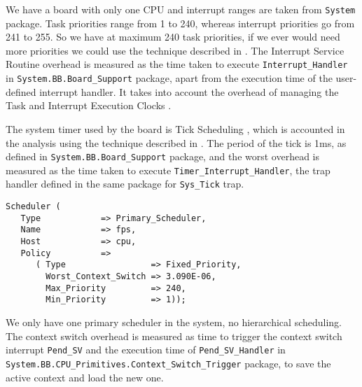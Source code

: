 \documentclass{article}
\begin{document}
We have a board with only one CPU and interrupt ranges are taken from \texttt{System} package. Task priorities range from 1 to 240, whereas interrupt priorities go from 241 to 255. So we have at maximum 240 task priorities, if we ever would need more priorities we could use the technique described in \cite{limited-priorities}. The Interrupt Service Routine overhead is measured as the time taken to execute \texttt{Interrupt\_Handler} in \texttt{System.BB.Board\_Support} package, apart from the execution time of the user-defined interrupt handler. It takes into account the overhead of managing the Task and Interrupt Execution Clocks \cite{etc}.

The system timer used by the board is Tick Scheduling \cite{tick-scheduling}, which is accounted in the analysis using the technique described in \cite{effects-runtime}. The period of the tick is 1ms, as defined in \texttt{System.BB.Board\_Support} package, and the worst overhead is measured as the time taken to execute \texttt{Timer\_Interrupt\_Handler}, the trap handler defined in the same package for \texttt{Sys\_Tick} trap.

\begin{lstlisting}
Scheduler (
   Type            => Primary_Scheduler,
   Name            => fps,
   Host            => cpu,
   Policy          =>
      ( Type                 => Fixed_Priority,
        Worst_Context_Switch => 3.090E-06,
        Max_Priority         => 240,
        Min_Priority         => 1));
\end{lstlisting}

We only have one primary scheduler in the system, no hierarchical scheduling. The context switch overhead is measured as time to trigger the context switch interrupt \texttt{Pend\_SV} and the execution time of \texttt{Pend\_SV\_Handler} in \texttt{System.BB.CPU\_Primitives.Context\_Switch\_Trigger} package, to save the active context and load the new one.
\end{document}
